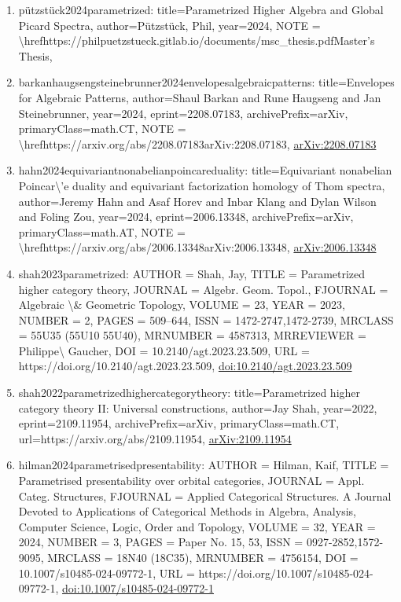 \documentclass[11pt]{article}
\begin{document}
\begin{enumerate}[leftmargin=*]
  \item pützstück2024parametrized: title=Parametrized Higher Algebra and Global Picard Spectra, author=Pützstück, Phil, year=2024, NOTE = \textbackslash{}hrefhttps://philpuetzstueck.gitlab.io/documents/msc\_thesis.pdfMaster's Thesis,
  \item barkanhaugsengsteinebrunner2024envelopesalgebraicpatterns: title=Envelopes for Algebraic Patterns, author=Shaul Barkan and Rune Haugseng and Jan Steinebrunner, year=2024, eprint=2208.07183, archivePrefix=arXiv, primaryClass=math.CT, NOTE = \textbackslash{}hrefhttps://arxiv.org/abs/2208.07183arXiv:2208.07183, \href{https://arxiv.org/abs/2208.07183}{arXiv:2208.07183}
  \item hahn2024equivariantnonabelianpoincareduality: title=Equivariant nonabelian Poincar\textbackslash{}'e duality and equivariant factorization homology of Thom spectra, author=Jeremy Hahn and Asaf Horev and Inbar Klang and Dylan Wilson and Foling Zou, year=2024, eprint=2006.13348, archivePrefix=arXiv, primaryClass=math.AT, NOTE = \textbackslash{}hrefhttps://arxiv.org/abs/2006.13348arXiv:2006.13348, \href{https://arxiv.org/abs/2006.13348}{arXiv:2006.13348}
  \item shah2023parametrized: AUTHOR = Shah, Jay, TITLE = Parametrized higher category theory, JOURNAL = Algebr. Geom. Topol., FJOURNAL = Algebraic \textbackslash{}\& Geometric Topology, VOLUME = 23, YEAR = 2023, NUMBER = 2, PAGES = 509--644, ISSN = 1472-2747,1472-2739, MRCLASS = 55U35 (55U10 55U40), MRNUMBER = 4587313, MRREVIEWER = Philippe\textbackslash{} Gaucher, DOI = 10.2140/agt.2023.23.509, URL = https://doi.org/10.2140/agt.2023.23.509, \href{https://doi.org/10.2140/agt.2023.23.509}{doi:10.2140/agt.2023.23.509}
  \item shah2022parametrizedhighercategorytheory: title=Parametrized higher category theory II: Universal constructions, author=Jay Shah, year=2022, eprint=2109.11954, archivePrefix=arXiv, primaryClass=math.CT, url=https://arxiv.org/abs/2109.11954, \href{https://arxiv.org/abs/2109.11954}{arXiv:2109.11954}
  \item hilman2024parametrisedpresentability: AUTHOR = Hilman, Kaif, TITLE = Parametrised presentability over orbital categories, JOURNAL = Appl. Categ. Structures, FJOURNAL = Applied Categorical Structures. A Journal Devoted to Applications of Categorical Methods in Algebra, Analysis, Computer Science, Logic, Order and Topology, VOLUME = 32, YEAR = 2024, NUMBER = 3, PAGES = Paper No. 15, 53, ISSN = 0927-2852,1572-9095, MRCLASS = 18N40 (18C35), MRNUMBER = 4756154, DOI = 10.1007/s10485-024-09772-1, URL = https://doi.org/10.1007/s10485-024-09772-1, \href{https://doi.org/10.1007/s10485-024-09772-1}{doi:10.1007/s10485-024-09772-1}

\end{enumerate}
\end{document}
